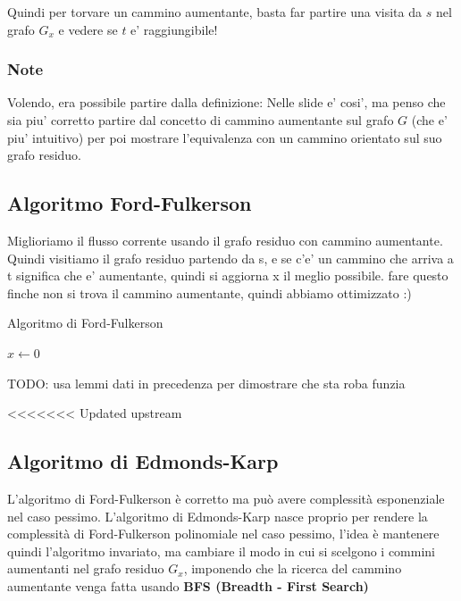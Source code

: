 Quindi per torvare un cammino aumentante, basta far partire una visita da $ s  $ nel grafo $ G_x $ e vedere se $ t $ e' raggiungibile!

\subsubsection{Note}
Volendo, era possibile partire dalla definizione:
Nelle slide e' cosi', ma penso che sia piu' corretto partire dal concetto di cammino aumentante sul grafo $ G $ (che e' piu' intuitivo) per poi mostrare l'equivalenza con un cammino orientato sul suo grafo residuo.


\subsection{Algoritmo Ford-Fulkerson}

Miglioriamo il flusso corrente usando il grafo residuo con cammino aumentante. Quindi visitiamo il grafo residuo partendo da s, e se c'e' un cammino che arriva a t significa che e' aumentante, quindi si aggiorna x il meglio possibile. fare questo finche non si trova il cammino aumentante, quindi abbiamo ottimizzato :)

\begin{algorithm}
  \caption{Algoritmo di Ford-Fulkerson}

  $x \gets 0$\;

\end{algorithm}

TODO: usa lemmi dati in precedenza per dimostrare che sta roba funzia

<<<<<<< Updated upstream
\subsection{Algoritmo di Edmonds-Karp}
L'algoritmo di Ford-Fulkerson è corretto ma può avere complessità esponenziale nel caso pessimo. L'algoritmo di Edmonds-Karp nasce proprio per rendere la complessità di Ford-Fulkerson polinomiale nel caso pessimo, l'idea è mantenere quindi l'algoritmo invariato, ma cambiare il modo in cui si scelgono i commini aumentanti nel grafo residuo $G_x$, imponendo che la ricerca del cammino aumentante venga fatta usando \textbf{BFS (Breadth - First Search)}

